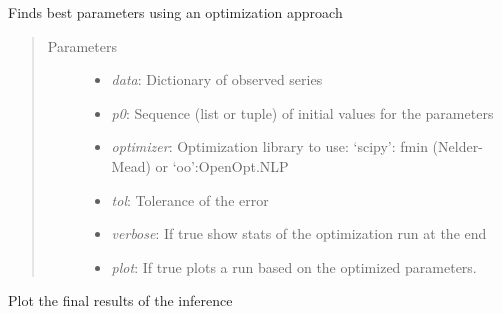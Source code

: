 \documentclass[a4paper,10pt,english]{sphinxmanual}
\begin{document}
\begin{fulllineitems}
\begin{fulllineitems}
\begin{quote}
\begin{description}
\end{description}\end{quote}

\end{fulllineitems}


\begin{fulllineitems}
\label{BIP.Bayes:BIP.Bayes.Melding.FitModel.optimize}
Finds best parameters using an optimization approach
\begin{quote}\begin{description}
\item[{Parameters}] \leavevmode\begin{itemize}
\item {} 
\emph{data}: Dictionary of observed series

\item {} 
\emph{p0}: Sequence (list or tuple) of initial values for the parameters

\item {} 
\emph{optimizer}: Optimization library to use: `scipy': fmin (Nelder-Mead) or `oo':OpenOpt.NLP

\item {} 
\emph{tol}: Tolerance of the error

\item {} 
\emph{verbose}: If true show stats of the optimization run at the end

\item {} 
\emph{plot}: If true plots a run based on the optimized parameters.

\end{itemize}

\end{description}\end{quote}

\end{fulllineitems}


\begin{fulllineitems}
\label{BIP.Bayes:BIP.Bayes.Melding.FitModel.plot_results}
Plot the final results of the inference


\end{fulllineitems}
\end{fulllineitems}
\end{document}
